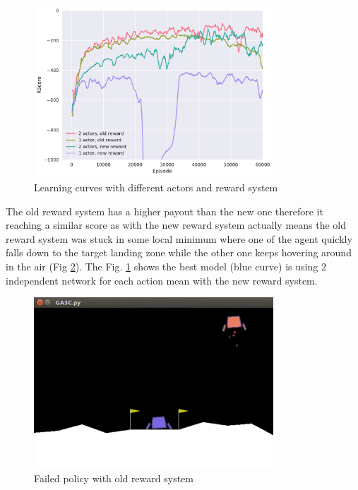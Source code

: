 \documentclass[12pt, letter]{article}
\begin{document}
\begin{figure}[htbp]
	\centering
	\includegraphics[width=0.8\textwidth]{figures/actor_reward_comparison.pdf}
	\caption{Learning curves with different actors and reward system}
	\label{fig:actor_reward}
\end{figure}

The old reward system has a higher payout than the new one therefore it reaching a similar score as with the new reward system actually means the old reward system was stuck in some local minimum where one of the agent quickly falls down to the target landing zone while the other one keeps hovering around in the air (Fig \ref{fig:fail}). The Fig. \ref{fig:actor_reward} shows the best model (blue curve) is using 2 independent network for each action mean with the new reward system.

\begin{figure}[htbp]
	\centering
	\includegraphics[width=0.8\textwidth]{figures/fail.png}
	\caption{Failed policy with old reward system}
	\label{fig:fail}
\end{figure}
\end{document}
